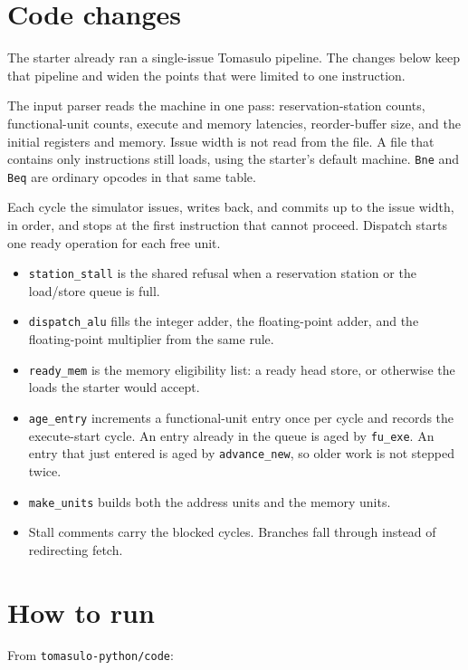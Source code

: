 \documentclass[11pt]{article}
\begin{document}
\section{Code changes}

The starter already ran a single-issue Tomasulo pipeline. The changes below keep that pipeline and widen the points that were limited to one instruction.

The input parser reads the machine in one pass: reservation-station counts, functional-unit counts, execute and memory latencies, reorder-buffer size, and the initial registers and memory. Issue width is not read from the file. A file that contains only instructions still loads, using the starter's default machine. \texttt{Bne} and \texttt{Beq} are ordinary opcodes in that same table.

Each cycle the simulator issues, writes back, and commits up to the issue width, in order, and stops at the first instruction that cannot proceed. Dispatch starts one ready operation for each free unit.

\begin{itemize}
\item \texttt{station\_stall} is the shared refusal when a reservation station or the load/store queue is full.
\item \texttt{dispatch\_alu} fills the integer adder, the floating-point adder, and the floating-point multiplier from the same rule.
\item \texttt{ready\_mem} is the memory eligibility list: a ready head store, or otherwise the loads the starter would accept.
\item \texttt{age\_entry} increments a functional-unit entry once per cycle and records the execute-start cycle. An entry already in the queue is aged by \texttt{fu\_exe}. An entry that just entered is aged by \texttt{advance\_new}, so older work is not stepped twice.
\item \texttt{make\_units} builds both the address units and the memory units.
\item Stall comments carry the blocked cycles. Branches fall through instead of redirecting fetch.
\end{itemize}

\section{How to run}

From \texttt{tomasulo-python/code}:
\end{document}
